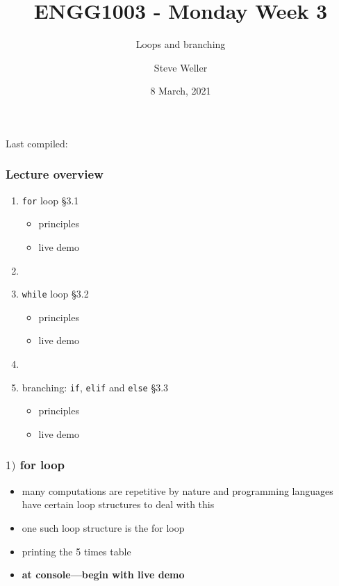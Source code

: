 \documentclass[english,14pt]{beamer}
\title{ENGG1003 - Monday Week 3}
\subtitle{Loops and branching}
\author{Steve Weller}
\institute{University of Newcastle}
\date{8 March, 2021}
\newcommand\red[1]{{\color{red} #1}}
\begin{document}
\begin{flushleft}
{\scriptsize Last compiled:~\DTMnow}
\vspace*{-5mm}
\end{flushleft}
\framebreak


\begin{frame}[fragile]

\frametitle{Lecture overview}
\begin{enumerate}
	\item \texttt{for} loop \red{\S3.1}
	\begin{itemize}
		\item principles
		\item live demo
	\end{itemize}

	\item[]
	
	\item \texttt{while} loop \red{\S3.2}
		\begin{itemize}
			\item principles
			\item live demo
		\end{itemize}

	\item[]
	
	\item branching: \texttt{if}, \texttt{elif} and \texttt{else} \red{\S3.3}
		\begin{itemize}
			\item principles
			\item live demo
		\end{itemize}
		
\end{enumerate}

\end{frame}


\begin{frame}[fragile]

\frametitle{$1)$ for loop}

\begin{itemize}
	\item many computations are repetitive by nature and programming languages have certain loop structures to deal with this
	\item one such loop structure is the for loop
	\item printing the 5 times table
	\item \textbf{at console---begin with live demo}
\end{itemize}


\end{frame}
\end{document}
